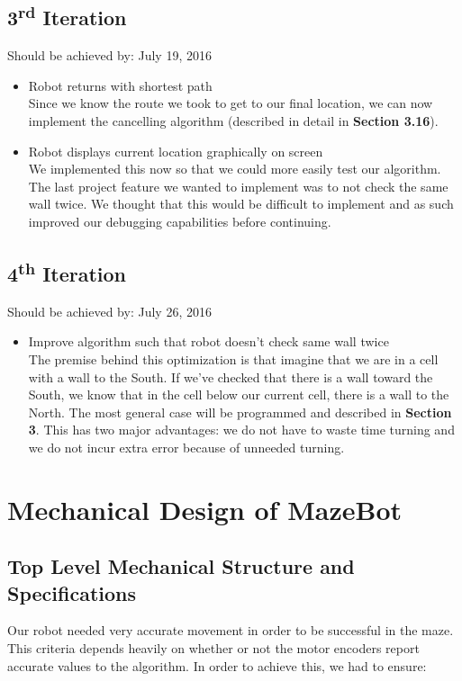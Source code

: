\documentclass[11pt]{article}
\newcommand{\ts}{\textsuperscript}
\begin{document}
\subsection{3\ts{rd} Iteration}
Should be achieved by: July 19, 2016
\begin{itemize}
\item Robot returns with shortest path\\
Since we know the route we took to get to our final location, we can now implement the cancelling algorithm (described in detail in \textbf{Section 3.16}).
\item Robot displays current location graphically on screen\\
We implemented this now so that we could more easily test our algorithm. The last project feature we wanted to implement was to not check the same wall twice. We thought that this would be difficult to implement and as such improved our debugging capabilities before continuing.
\end{itemize}

\subsection{4\ts{th} Iteration}
Should be achieved by: July 26, 2016
\begin{itemize}
\item Improve algorithm such that robot doesn't check same wall twice\\
The premise behind this optimization is that imagine that we are in a cell with a wall to the South. If we've checked that there is a wall toward the South, we know that in the cell below our current cell, there is a wall to the North. The most general case will be programmed and described in \textbf{Section 3}. This has two major advantages: we do not have to waste time turning and we do not incur extra error because of unneeded turning.
\end{itemize}
\newpage




\section{Mechanical Design of MazeBot}
\subsection{Top Level Mechanical Structure and Specifications}
Our robot needed very accurate movement in order to be successful in the maze. This criteria depends heavily on whether or not the motor encoders report accurate values to the algorithm. In order to achieve this, we had to ensure:
\end{document}
